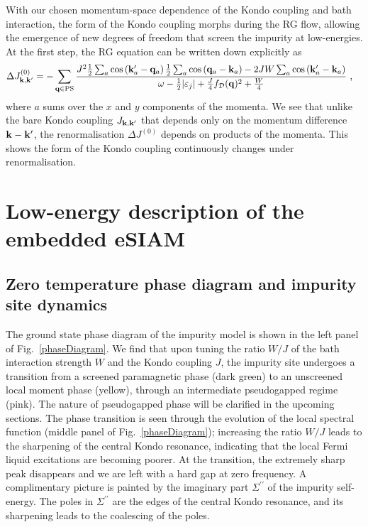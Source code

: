 \documentclass[reprint,hidelinks,onecolumn]{revtex4-2}
\begin{document}
With our chosen momentum-space dependence of the Kondo coupling and bath interaction, the form of the Kondo coupling morphs during the RG flow, allowing the emergence of new degrees of freedom that screen the impurity at low-energies. At the first step, the RG equation can be written down explicitly as
\begin{equation}\begin{aligned}
	&\Delta J^{(0)}_{{\bf k}, {\bf k}^\prime} = -\sum_{{\bf q} \in \text{PS}} \frac{J^2 \frac{1}{2}\sum_a\cos\left({\bf k}^\prime_a - {\bf q}_a\right)\frac{1}{2}\sum_a\cos\left({\bf q}_a - {\bf k}_a\right) - 2JW \sum_a\cos\left({\bf k}^\prime_a - {\bf k}_a\right)}{\omega - \frac{1}{2}|\varepsilon_j| + \frac{J}{4}f_\mathcal{D}({\bf q})^2 + \frac{W}{4}}~,
\end{aligned}\end{equation}
where \(a\) sums over the \(x\) and \(y\) components of the momenta. We see that unlike the bare Kondo coupling \(J_{{\bf k}, {\bf k}^\prime}\) that depends only on the momentum difference \({\bf k} - {\bf k}^\prime\), the renormalisation \(\Delta J^{(0)}\) depends on products of the momenta. This shows the form of the Kondo coupling continuously changes under renormalisation.

\section{Low-energy description of the embedded eSIAM}
\subsection{Zero temperature phase diagram and impurity site dynamics}
The ground state phase diagram of the impurity model is shown in the left panel of Fig.~\ref{phaseDiagram}. We find that upon tuning the ratio \(W/J\) of the bath interaction strength \(W\) and the Kondo coupling \(J\), the impurity site undergoes a transition from a screened paramagnetic phase (dark green) to an unscreened local moment phase (yellow), through an intermediate pseudogapped regime (pink). The nature of pseudogapped phase will be clarified in the upcoming sections. The phase transition is seen through the evolution of the local spectral function (middle panel of Fig.~\ref{phaseDiagram}); increasing the ratio \(W/J\) leads to the sharpening of the central Kondo resonance, indicating that the local Fermi liquid excitations are becoming poorer. At the transition, the extremely sharp peak disappears and we are left with a hard gap at zero frequency. A complimentary picture is painted by the imaginary part \(\Sigma^{\prime\prime}\) of the impurity self-energy. The poles in \(\Sigma^{\prime\prime}\) are the edges of the central Kondo resonance, and its sharpening leads to the coalescing of the poles.
\end{document}
